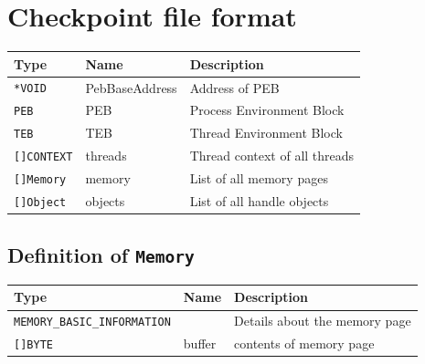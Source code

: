 \documentclass[a4paper, 11pt, english]{report}
\begin{document}




\appendix
\chapter{Checkpoint file format}
\label{ap:fileformat}

\begin{tabular}{p{} p{} p{} }
	\hline
	\textbf{Type} & \textbf{Name} & \textbf{Description } \\
	\hline
	\texttt{*VOID} & PebBaseAddress & Address of PEB \\
	\texttt{PEB} & PEB & Process Environment Block \\
	\texttt{TEB} & TEB & Thread Environment Block\\
	\texttt{[]CONTEXT} & threads & Thread context of all threads \\
	\texttt{[]Memory} & memory & List of all memory pages \\
	\texttt{[]Object} & objects & List of all handle objects \\
	\hline
\end{tabular}

\section{Definition of \texttt{Memory}}
\begin{tabular}{p{} p{} p{} }
	\hline
	\textbf{Type} & \textbf{Name} & \textbf{Description } \\
	\hline
	\texttt{MEMORY\_BASIC\_INFORMATION} & & Details about the memory page \\
	\texttt{[]BYTE} & buffer & contents of memory page \\
	\hline
\end{tabular}
\end{document}
